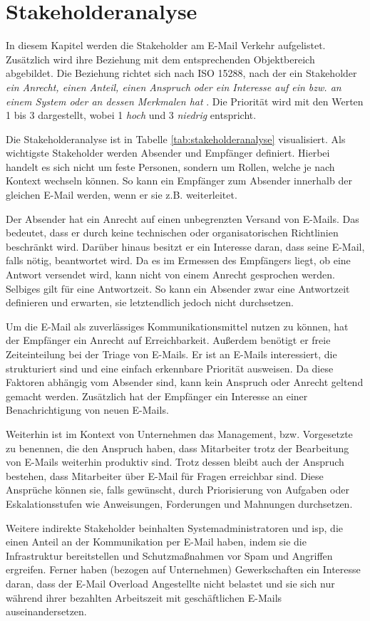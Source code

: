 
\chapter{Stakeholderanalyse}
\label{Stakeholderanalyse}

In diesem Kapitel werden die Stakeholder am E-Mail Verkehr aufgelistet. Zusätzlich wird ihre Beziehung mit dem entsprechenden Objektbereich abgebildet. Die Beziehung richtet sich nach ISO 15288, nach der ein Stakeholder \emph{\glqq ein Anrecht, einen Anteil, einen Anspruch oder ein Interesse auf ein bzw. an einem System oder an dessen Merkmalen hat\grqq} \citep[S. 37]{ISO2015}. Die Priorität wird mit den Werten 1 bis 3 dargestellt, wobei 1 \textit{hoch} und 3 \textit{niedrig} entspricht.

Die Stakeholderanalyse ist in Tabelle \ref{tab:stakeholderanalyse} visualisiert. Als wichtigste Stakeholder werden Absender und Empfänger definiert. Hierbei handelt es sich nicht um feste Personen, sondern um Rollen, welche je nach Kontext wechseln können. So kann ein Empfänger zum Absender innerhalb der gleichen E-Mail werden, wenn er sie z.B. weiterleitet.

Der Absender hat ein Anrecht auf einen unbegrenzten Versand von E-Mails. Das bedeutet, dass er durch keine technischen oder organisatorischen Richtlinien beschränkt wird. Darüber hinaus besitzt er ein Interesse daran, dass seine E-Mail, falls nötig, beantwortet wird. Da es im Ermessen des Empfängers liegt, ob eine Antwort versendet wird, kann nicht von einem Anrecht gesprochen werden. Selbiges gilt für eine Antwortzeit. So kann ein Absender zwar eine Antwortzeit definieren und erwarten, sie letztendlich jedoch nicht durchsetzen.

Um die E-Mail als zuverlässiges Kommunikationsmittel nutzen zu können, hat der Empfänger ein Anrecht auf Erreichbarkeit. Außerdem benötigt er freie Zeiteinteilung bei der Triage von E-Mails. Er ist an E-Mails interessiert, die strukturiert sind und eine einfach erkennbare Priorität ausweisen. Da diese Faktoren abhängig vom Absender sind, kann kein Anspruch oder Anrecht geltend gemacht werden. Zusätzlich hat der Empfänger ein Interesse an einer Benachrichtigung von neuen E-Mails.

Weiterhin ist im Kontext von Unternehmen das Management, bzw. Vorgesetzte zu benennen, die den Anspruch haben, dass Mitarbeiter trotz der Bearbeitung von E-Mails weiterhin produktiv sind. Trotz dessen bleibt auch der Anspruch bestehen, dass Mitarbeiter über E-Mail für Fragen erreichbar sind. Diese Ansprüche können sie, falls gewünscht, durch Priorisierung von Aufgaben oder Eskalationsstufen wie Anweisungen, Forderungen und Mahnungen durchsetzen.

Weitere indirekte Stakeholder beinhalten Systemadministratoren und \acrfull{isp}, die einen Anteil an der Kommunikation per E-Mail haben, indem sie die Infrastruktur bereitstellen und Schutzmaßnahmen vor Spam und Angriffen ergreifen. Ferner haben (bezogen auf Unternehmen) Gewerkschaften ein Interesse daran, dass der E-Mail Overload Angestellte nicht belastet und sie sich nur während ihrer bezahlten Arbeitszeit mit geschäftlichen E-Mails auseinandersetzen.   
